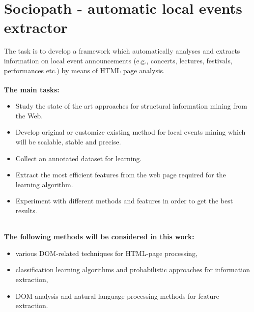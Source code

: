  \cleardoublepage \thispagestyle{empty}

\chapter*{Sociopath - automatic local events extractor}

The task is to develop a framework which automatically analyses and extracts information on local event announcements (e.g., concerts, lectures, festivals, performances etc.) by means of HTML page analysis.
\\
\\
\textbf {The main tasks:}

\begin{itemize}
\item Study the state of the art approaches for structural information mining from the Web.
\item Develop original or customize existing method for local events mining which will be scalable, stable and precise.
\item Collect an annotated dataset for learning.
\item Extract the most efficient features from the web page required for the learning algorithm.
\item Experiment with different methods and features in order to get the best results. 
\end{itemize}
\\
\textbf {The following methods will be considered in this work:}

\begin{itemize}
\item various DOM-related techniques for HTML-page processing,
\item classification learning algorithms and probabilistic approaches for information extraction,
\item DOM-analysis and natural language processing methods for feature extraction.
\end{itemize}
